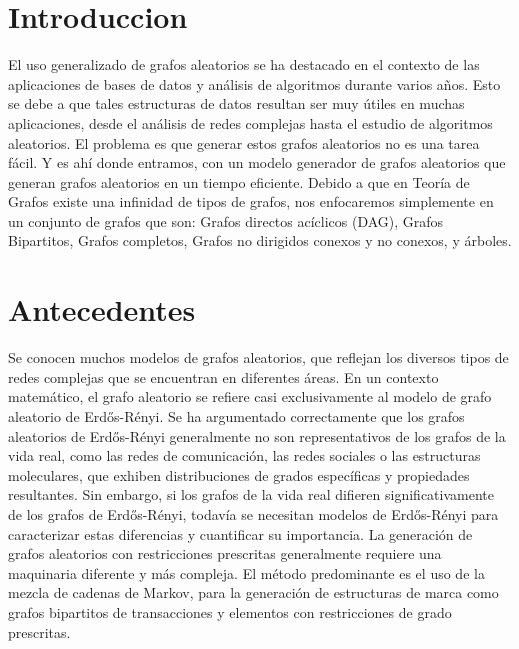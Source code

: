 \documentclass[11pt]{extarticle}
\begin{document}
\newcommand\justificacion{Justificaci\'on }
\newcommand\guion{\item[-]}

\renewcommand{\labelenumii}{\arabic{enumi}.\arabic{enumii}}
\renewcommand{\labelenumiii}{\arabic{enumi}.\arabic{enumii}.\arabic{enumiii}}
\renewcommand{\labelenumiv}{\arabic{enumi}.\arabic{enumii}.\arabic{enumiii}.\arabic{enumiv}}

\section{Introduccion} 
El uso generalizado de grafos aleatorios se ha destacado en el contexto de las 
aplicaciones de bases de datos y análisis de algoritmos durante 
varios años. Esto se debe a que tales estructuras de datos resultan ser muy útiles 
en muchas  aplicaciones, desde el análisis de redes complejas hasta el estudio de 
algoritmos aleatorios. El problema es que generar estos grafos aleatorios no es una 
tarea fácil. Y es ahí donde entramos, con un modelo generador de grafos aleatorios que 
generan grafos aleatorios en un tiempo eficiente. Debido a que en Teoría de Grafos 
existe una infinidad de tipos de grafos, nos enfocaremos simplemente en un conjunto 
de grafos que son: Grafos directos acíclicos (DAG), Grafos Bipartitos, Grafos completos,
 Grafos no dirigidos conexos y no conexos, y árboles.

\section{Antecedentes}
Se conocen muchos modelos de grafos aleatorios, que reflejan los diversos tipos de redes
complejas que se encuentran en diferentes áreas. En un contexto matemático, el grafo aleatorio 
se refiere casi exclusivamente al modelo de grafo aleatorio de Erdős-Rényi. 
Se ha argumentado correctamente que los grafos aleatorios de Erdős-Rényi
generalmente no son representativos de los grafos de la vida real, como las redes de comunicación,
las redes sociales o las estructuras moleculares, que exhiben distribuciones de grados específicas y propiedades 
resultantes. Sin embargo, si los grafos de la vida real difieren significativamente de los grafos 
de Erdős-Rényi, todavía se necesitan modelos de Erdős-Rényi para caracterizar estas diferencias y cuantificar 
su importancia. La generación de grafos aleatorios con restricciones prescritas generalmente requiere una maquinaria diferente 
y más compleja. El método predominante es el uso de la mezcla de cadenas de Markov, para la generación de estructuras 
de marca como grafos bipartitos de transacciones y elementos con restricciones de grado prescritas.\\
\end{document}
